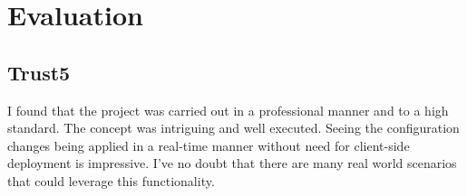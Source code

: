 \section{Evaluation}

\subsection{Trust5}

I found that the project was carried out in a professional manner and to a high standard. The concept was intriguing and well executed. Seeing the configuration changes being applied in a real-time manner without need for client-side deployment is impressive. I've no doubt that there are many real world scenarios that could leverage this functionality.
